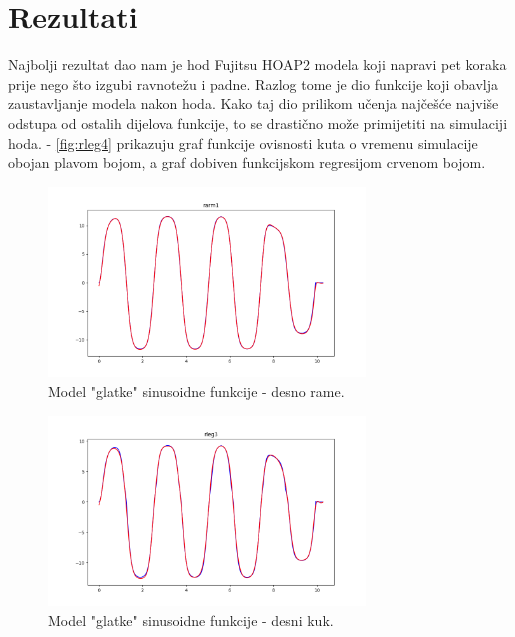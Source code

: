 \documentclass[times, utf8, zavrsni]{fer}
\begin{document}
\chapter{Rezultati}
Najbolji rezultat dao nam je hod Fujitsu HOAP2 modela koji napravi pet koraka prije nego što izgubi ravnotežu i padne. Razlog tome je dio funkcije koji obavlja zaustavljanje modela nakon hoda. Kako taj dio prilikom učenja najčešće najviše odstupa od ostalih dijelova funkcije, to se drastično može primijetiti na simulaciji hoda. 
 - \ref{fig:rleg4} prikazuju graf funkcije ovisnosti kuta o vremenu simulacije obojan plavom bojom, a graf dobiven funkcijskom regresijom crvenom bojom.

\begin{figure}[htb!]
\centering
\includegraphics[width=0.75\textwidth]{rarm1.png}
\caption{Model "glatke" sinusoidne funkcije - desno rame.}
\label{fig:ramr1}
\end{figure}

\begin{figure}[htb!]
\centering
\includegraphics[width=0.75\textwidth]{rleg3.png}
\caption{Model "glatke" sinusoidne funkcije - desni kuk.}
\label{fig:rleg3}
\end{figure}
\end{document}
